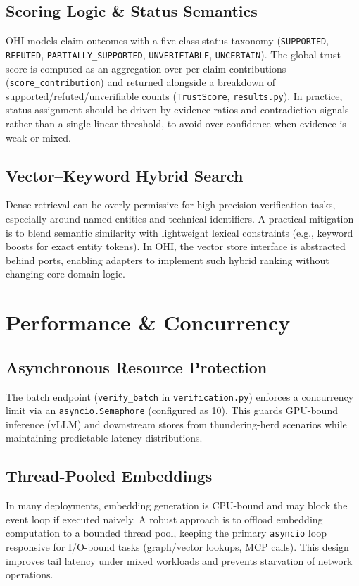 \documentclass[10pt,a4paper,twocolumn]{article}
\begin{document}
\subsection{Scoring Logic \& Status Semantics}
OHI models claim outcomes with a five-class status taxonomy (\texttt{SUPPORTED}, \texttt{REFUTED}, \texttt{PARTIALLY\_SUPPORTED}, \texttt{UNVERIFIABLE}, \texttt{UNCERTAIN}). The global trust score is computed as an aggregation over per-claim contributions (\texttt{score\_contribution}) and returned alongside a breakdown of supported/refuted/unverifiable counts (\texttt{TrustScore}, \texttt{results.py}). In practice, status assignment should be driven by evidence ratios and contradiction signals rather than a single linear threshold, to avoid over-confidence when evidence is weak or mixed.

\subsection{Vector--Keyword Hybrid Search}
Dense retrieval can be overly permissive for high-precision verification tasks, especially around named entities and technical identifiers. A practical mitigation is to blend semantic similarity with lightweight lexical constraints (e.g., keyword boosts for exact entity tokens). In OHI, the vector store interface is abstracted behind ports, enabling adapters to implement such hybrid ranking without changing core domain logic.

\section{Performance \& Concurrency}

\subsection{Asynchronous Resource Protection}
The batch endpoint (\texttt{verify\_batch} in \texttt{verification.py}) enforces a concurrency limit via an \texttt{asyncio.Semaphore} (configured as 10). This guards GPU-bound inference (vLLM) and downstream stores from thundering-herd scenarios while maintaining predictable latency distributions.

\subsection{Thread-Pooled Embeddings}
In many deployments, embedding generation is CPU-bound and may block the event loop if executed naively. A robust approach is to offload embedding computation to a bounded thread pool, keeping the primary \texttt{asyncio} loop responsive for I/O-bound tasks (graph/vector lookups, MCP calls). This design improves tail latency under mixed workloads and prevents starvation of network operations.
\end{document}
